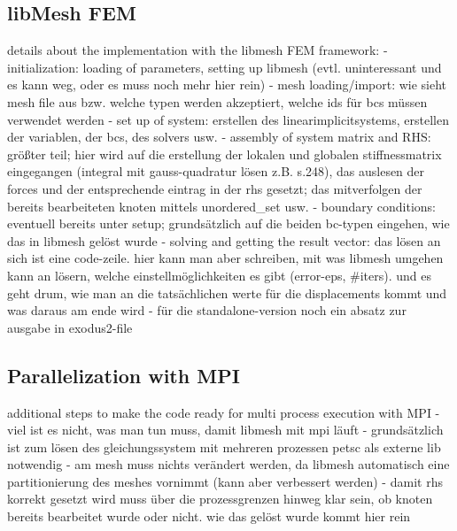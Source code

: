 \documentclass[11pt,twoside]{scrartcl}
\begin{document}
 \subsection{libMesh FEM}
 details about the implementation with the libmesh FEM framework:\newline
 - initialization: loading of parameters, setting up libmesh (evtl. uninteressant und es kann weg, oder es muss noch mehr hier rein)\newline
 - mesh loading/import: wie sieht mesh file aus bzw. welche typen werden akzeptiert, welche ids für bcs müssen verwendet werden\newline
 - set up of system: erstellen des linearimplicitsystems, erstellen der variablen, der bcs, des solvers usw.\newline
 - assembly of system matrix and RHS: größter teil; hier wird auf die erstellung der lokalen und globalen stiffnessmatrix eingegangen (integral mit gauss-quadratur lösen z.B. \cite{steinke2005finite} s.248), das auslesen der forces und der entsprechende eintrag in der rhs gesetzt; das mitverfolgen der bereits bearbeiteten knoten mittels unordered\_set usw.\newline
 - boundary conditions: eventuell bereits unter setup; grundsätzlich auf die beiden bc-typen eingehen, wie das in libmesh gelöst wurde\newline
 - solving and getting the result vector: das lösen an sich ist eine code-zeile. hier kann man aber schreiben, mit was libmesh umgehen kann an lösern, welche einstellmöglichkeiten es gibt (error-eps, \#iters). und es geht drum, wie man an die tatsächlichen werte für die displacements kommt und was daraus am ende wird\newline
 - für die standalone-version noch ein absatz zur ausgabe in exodus2-file
 \subsection{Parallelization with MPI}
 additional steps to make the code ready for multi process execution with MPI\newline
 - viel ist es nicht, was man tun muss, damit libmesh mit mpi läuft\newline
 - grundsätzlich ist zum lösen des gleichungssystem mit mehreren prozessen petsc als externe lib notwendig\newline
 - am mesh muss nichts verändert werden, da libmesh automatisch eine partitionierung des meshes vornimmt (kann aber verbessert werden)\newline
 - damit rhs korrekt gesetzt wird muss über die prozessgrenzen hinweg klar sein, ob knoten bereits bearbeitet wurde oder nicht. wie das gelöst wurde kommt hier rein\newline
\end{document}
